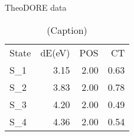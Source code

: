 \documentclass[a4paper]{article}
\begin{document}
TheoDORE data
\begin{table}
\caption{(Caption)}
\begin{tabular}{lrrr}
State & dE(eV) & POS & CT\\
S_1 & 3.15 & 2.00 & 0.63\\
S_2 & 3.83 & 2.00 & 0.78\\
S_3 & 4.20 & 2.00 & 0.49\\
S_4 & 4.36 & 2.00 & 0.54
\end{tabular}
\end{table}
\end{document}
